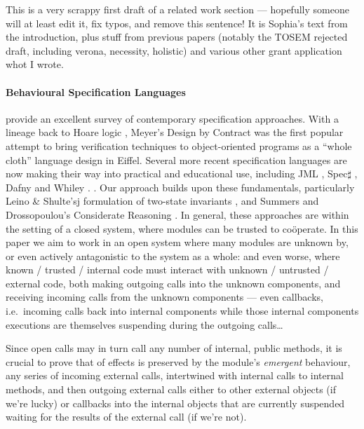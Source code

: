         
This is a very scrappy first draft of a related work section ---
hopefully someone will at least edit it, fix typos, and remove this
sentence! It is Sophia's text from the introduction, plus stuff from
previous papers (notably the TOSEM rejected draft, including verona,
necessity, holistic) and various other grant application whot I wrote.


\paragraph{Behavioural Specification Languages} 

\citet{behavSurvey2012} provide an excellent survey of
contemporary specification approaches.  With a lineage back to Hoare
logic \cite{Hoare69}, Meyer's Design by Contract \cite{Meyer97} was the
first popular attempt to bring verification techniques to
object-oriented programs as a ``whole cloth'' language design in
Eiffel.  Several more recent specification languages are now making
their way into practical and educational use, including JML
\cite{Leavens-etal07}, Spec$\sharp$ \cite{BarLeiSch05}, Dafny
\cite{dafny} and Whiley \cite{whiley15}.
. Our approach builds upon
these fundamentals, particularly Leino \& Shulte'sj
formulation of
two-state invariants \cite{usingHistory}, and Summers and
Drossopoulou's Considerate Reasoning \cite{considerate}.
%
In general, these approaches are within the setting of a closed
system, where modules can be trusted to co{\"o}perate. In this paper
we aim to
work
in an open system where many modules are unknown by, or even actively
antagonistic to the system as a whole: and even worse, where
known / trusted / internal code must interact with unknown / untrusted
/ external code, both making outgoing calls into the unknown components,
and receiving incoming calls from the unknown components --- even
callbacks, i.e.\ incoming calls back into internal components while
those internal components executions are themselves suspending during
the outgoing calls\ldots

Since open calls may in turn call any number of internal, public
methods, it is crucial to prove that \taming of effects is preserved
by the module's \emph{emergent} behaviour, \ie any series of incoming
external calls, intertwined with internal calls to internal methods,
and then outgoing external calls either to other external objects (if
we're lucky) or callbacks into the internal objects that are currently
suspended waiting for the results of the external call (if we're not).


